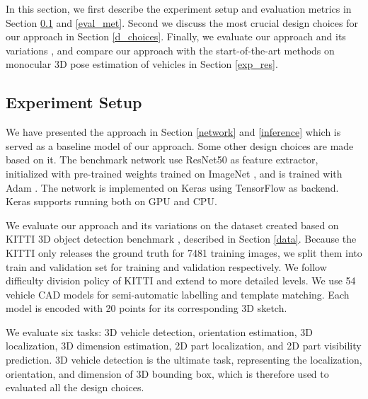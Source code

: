 In this section, we first describe the experiment setup and evaluation metrics in Section \ref{setup} and \ref{eval_met}. Second we discuss the most crucial design choices for our approach in Section \ref{d_choices}. Finally, we evaluate our approach and its variations , and compare our approach with the start-of-the-art methods on monocular 3D pose estimation of vehicles in Section \ref{exp_res}.

\subsection{Experiment Setup}
\label{setup}

We have presented the approach in Section \ref{network} and \ref{inference} which is served as a baseline model of our approach. Some other design choices are made based on it. The benchmark network use ResNet50 \cite{DBLP:journals/corr/HeZRS15} as feature extractor, initialized with pre-trained weights trained on ImageNet \cite{DBLP:Russakovsky14}, and is trained with Adam \cite{DBLP:journals/corr/KingmaB14}. The network is implemented on Keras \cite{chollet2015keras} using TensorFlow \cite{tensorflow2015-whitepaper} as backend. Keras supports running both on GPU and CPU. 

We evaluate our approach and its variations on the dataset created based on KITTI 3D object detection benchmark \cite{Geiger2012CVPR}, described in Section \ref{data}. Because the KITTI only releases the ground truth for 7481 training images, we split them into train and validation set for training and validation respectively. We follow difficulty division policy of  KITTI and extend to more detailed levels. We use 54 vehicle CAD models \cite{NIPS2012_4562} for semi-automatic labelling and template matching. Each model is encoded with 20 points for its corresponding 3D sketch.

We evaluate six tasks: 3D vehicle detection, orientation estimation, 3D localization, 3D dimension estimation, 2D part localization, and 2D part visibility prediction. 3D vehicle detection is the ultimate task, representing the localization, orientation, and dimension of 3D bounding box,  which is therefore used to evaluated all the design choices.